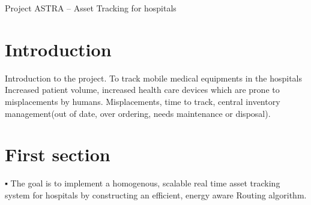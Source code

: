 Project A\+S\+T\+RA – Asset Tracking for hospitals 

 \hypertarget{index_s0}{}\section{Introduction}\label{index_s0}
Introduction to the project. To track mobile medical equipments in the hospitals Increased patient volume, increased health care devices which are prone to misplacements by humans. Misplacements, time to track, central inventory management(out of date, over ordering, needs maintenance or disposal). 

 \hypertarget{index_s1}{}\section{First section}\label{index_s1}
▪ The goal is to implement a homogenous, scalable real time asset tracking system for hospitals by constructing an efficient, energy aware Routing algorithm. 